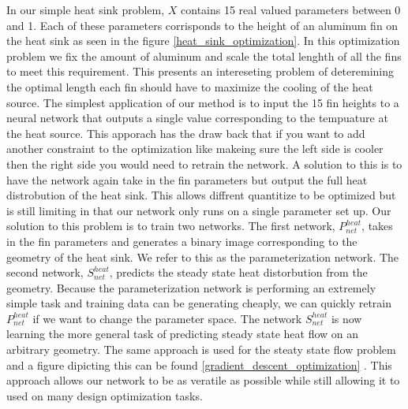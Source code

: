 \documentclass{article} %
\begin{document}
In our simple heat sink problem, $X$ contains 15 real valued parameters between 0 and 1. Each of these parameters corrisponds to the height of an aluminum fin on the heat sink as seen in the figure \ref{heat_sink_optimization}. In this optimization problem we fix the amount of aluminum and scale the total lenghth of all the fins to meet this requirement. This presents an intereseting problem of deteremining the optimal length each fin should have to maximize the cooling of the heat source. The simplest application of our method is to input the 15 fin heights to a neural network that outputs a single value corresponding to the tempuature at the heat source. This apporach has the draw back that if you want to add another constraint to the optimization like makeing sure the left side is cooler then the right side you would need to retrain the network. A solution to this is to have the network again take in the fin parameters but output the full heat distrobution of the heat sink. This allows diffrent quantitize to be optimized but is still limiting in that our network only runs on a single parameter set up. Our solution to this problem is to train two networks. The first network, $P^{heat}_{net}$, takes in the fin parameters and generates a binary image corresponding to the geometry of the heat sink. We refer to this as the parameterization network. The second network, $S^{heat}_{net}$, predicts the steady state heat distorbution from the geometry. Because the parameterization network is performing an extremely simple task and training data can be generating cheaply, we can quickly retrain $P^{heat}_{net}$ if we want to change the parameter space. The network $S^{heat}_{net}$ is now learning the more general task of predicting steady state heat flow on an arbitrary geometry. The same approach is used for the steaty state flow problem and a figure dipicting this can be found \ref{gradient_descent_optimization} . This approach allows our network to be as veratile as possible while still allowing it to used on many design optimization tasks.
\end{document}
